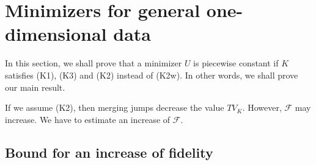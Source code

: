 \documentclass[11pt]{amsart} %
\numberwithin{equation}{section}
\begin{document}
\section{Minimizers for general one-dimensional data} \label{SGe} %

In this section, we shall prove that a minimizer $U$ is piecewise constant if $K$ satisfies (K1), (K3) and (K2) instead of (K2w).
 In other words, we shall prove our main result.

If we assume (K2), then merging jumps decrease the value $TV_K$.
 However, $\mathcal{F}$ may increase.
 We have to estimate an increase of $\mathcal{F}$.

\subsection{Bound for an increase of fidelity} \label{SEFid} %
\end{document}
